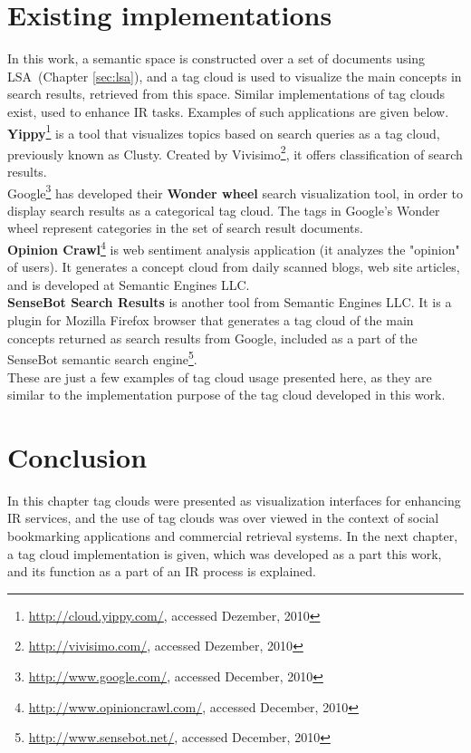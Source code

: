 \section{Existing implementations}
In this work, a semantic space is constructed over a set of documents using \gls{LSA}~(Chapter \ref{sec:lsa}), and a tag cloud is used to visualize the main concepts in search results, retrieved from this space. Similar implementations of tag clouds exist, used to enhance \gls{IR} tasks. Examples of such applications are given below. \\

\textbf{Yippy}\footnote{\url{http://cloud.yippy.com/}, accessed Dezember, 2010} is a tool that visualizes topics based on search queries as a tag cloud, previously known as Clusty. Created by Vivisimo\footnote{\url{http://vivisimo.com/}, accessed Dezember, 2010}, it offers classification of search results. \\

Google\footnote{\url{http://www.google.com/}, accessed December, 2010} has developed their \textbf{Wonder wheel} search visualization tool, in order to display search results as a categorical tag cloud. The tags in Google's Wonder wheel represent categories in the set of search result documents. \\ 

\textbf{Opinion Crawl}\footnote{\url{http://www.opinioncrawl.com/}, accessed December, 2010} is web sentiment analysis application (it analyzes the "opinion" of users). It generates a concept cloud from daily scanned blogs, web site articles, and is developed at Semantic Engines LLC.\\

\textbf{SenseBot Search Results} is another tool from Semantic Engines LLC. It is a plugin for Mozilla Firefox browser that generates a tag cloud of the main concepts returned as search results from Google, included as a part of the SenseBot semantic search engine\footnote{\url{http://www.sensebot.net/}, accessed December, 2010}.\\

These are just a few examples of tag cloud usage presented here, as they are similar to the implementation purpose of the tag cloud developed in this work.  \\


\section{Conclusion}
In this chapter tag clouds were presented as visualization interfaces for enhancing \gls{IR} services, and the use of tag clouds was over viewed in the context of social bookmarking applications and commercial retrieval systems. In the next chapter, a tag cloud implementation is given, which was developed as a part this work, and its function as a part of an \nopagebreak \gls{IR} process is explained. \\




